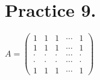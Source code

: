 \documentclass[a4paper,12pt]{article}
\begin{document}
\section*{Practice 9.}
$A=\begin{pmatrix}
                              1&1&1&\cdots &1\\
                              1&1&1&\cdots &1\\
                              \cdot&\cdot&\cdot&\cdots &\cdot \\                
                              \cdot&\cdot&\cdot&\cdots &\cdot \\
                                1&1&1&\cdots &1
                              \end{pmatrix}$


%
%
%
%
%
%
%
\end{document}
